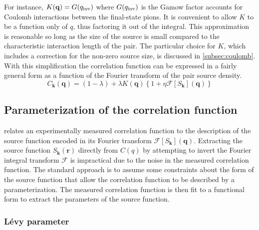 For instance, $K(\mathbf{q}) = G(q_{\mathrm{inv}})$ where $G(q_{\mathrm{inv}})$ is the Gamow factor accounts for Coulomb interactions between the final-state pions.
It is convenient to allow $K$ to be a function only of $q$, thus factoring it out of the integral.
This approximation is reasonable so long as the size of the source is small compared to the characteristic interaction length of the pair.
The particular choice for $K$, which includes a correction for the non-zero source size, is discussed in \cref{subsec:coulomb}.
With this simplification the correlation function can be expressed in a fairly general form as a function of the Fourier transform of the pair source density.
\begin{equation}
  \label{eq:correlation_function}
  C_\mathbf{k}(\mathbf{q}) = (1-\lambda) + \lambda K(\mathbf{q})\left\{ 1 + \eta \mathcal{F} \left[ S_\mathbf{k} \right](\mathbf{q}) \right\}
\end{equation}


\subsection{Parameterization of the correlation function}
 relates an experimentally measured correlation function to the description of the source function encoded in its Fourier transform $\mathcal{F}[S_\mathbf{k}](\mathbf{q})$.
Extracting the source function $S_\mathbf{k}(\mathbf{r})$ directly from $C(q)$ by attempting to invert the Fourier integral transform $\mathcal{F}$ is impractical due to the noise in the measured correlation function.
The standard approach is to assume some constraints about the form of the source function that allow the correlation function to be described by a parameterization.
The measured correlation function is then fit to a functional form to extract the parameters of the source function.

\subsubsection{L\'evy parameter}

